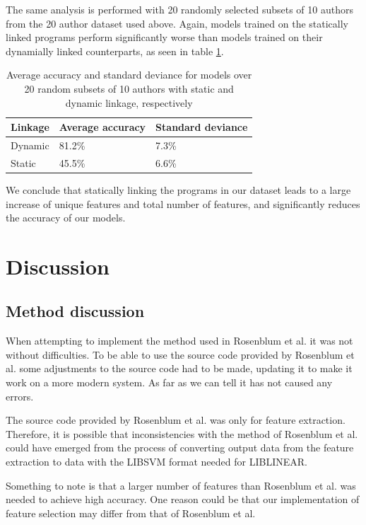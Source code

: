 \documentclass[a4paper,11pt]{kth-mag}
\begin{document}
The same analysis is performed with 20 randomly selected subsets of 10 authors
from the 20 author dataset used above. Again, models trained on the statically
linked programs perform significantly worse than models trained on their
dynamially linked counterparts, as seen in table \ref{tab:10-static-results}. 

\begin{table}[!htb]
    \centering
    \caption{Average accuracy and standard deviance for models over 20 random
    subsets of 10 authors with static and dynamic linkage, respectively}
        \begin{tabular}{ l l l }
        Linkage & Average accuracy & Standard deviance \\
        \hline
        Dynamic & 81.2\% & 7.3\% \\
        Static & 45.5\% & 6.6\%
        \end{tabular}
   
    \label{tab:10-static-results}
\end{table}

We conclude that statically linking the programs in our dataset leads to a
large increase of unique features and total number of features, and
significantly reduces the accuracy of our models.

\chapter{Discussion}
\section{Method discussion}
When attempting to implement the method used in Rosenblum et al. it was not
without difficulties. To be able to use the source code provided by Rosenblum
et al. some adjustments to the source code had to be made, updating it to make
it work on a more modern system. As far as we can tell it has not caused any
errors.

The source code provided by Rosenblum et al. was only for feature extraction.
Therefore, it is possible that inconsistencies with the method of Rosenblum et al. could have
emerged from the process of converting output data from the feature extraction to
data with the LIBSVM format needed for LIBLINEAR.

Something to note is that a larger number of features than Rosenblum et al. was needed to achieve high
accuracy. One reason could be that our implementation of feature selection may differ from that of
Rosenblum et al. 
\end{document}
